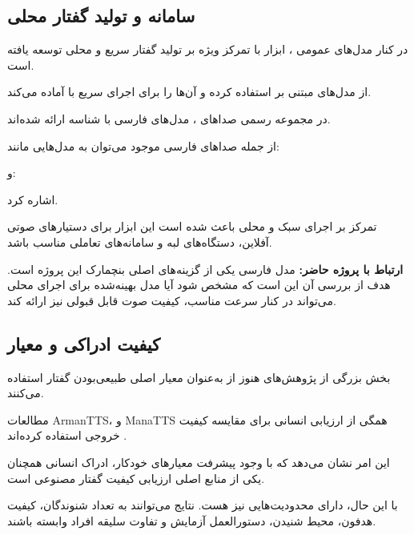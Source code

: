 \subsection{سامانه  و تولید گفتار محلی}

در کنار مدل‌های عمومی ، ابزار
با تمرکز ویژه بر تولید گفتار سریع و محلی توسعه یافته است.

 از مدل‌های مبتنی بر  استفاده کرده و آن‌ها را
برای اجرای سریع با
آماده می‌کند.

در مجموعه رسمی صداهای ، مدل‌های فارسی با شناسه
ارائه شده‌اند.

از جمله صداهای فارسی موجود می‌توان به مدل‌هایی مانند:

\begin{center}
\end{center}

و:

\begin{center}
\end{center}

اشاره کرد.

تمرکز  بر اجرای سبک و محلی باعث شده است این ابزار برای
دستیارهای صوتی آفلاین، دستگاه‌های لبه و سامانه‌های تعاملی
مناسب باشد.

\textbf{ارتباط با پروژه حاضر:}
مدل  فارسی یکی از گزینه‌های اصلی بنچمارک  این پروژه
است.
هدف از بررسی آن این است که مشخص شود آیا مدل بهینه‌شده برای
اجرای محلی می‌تواند در کنار سرعت مناسب، کیفیت صوت قابل
قبولی نیز ارائه کند.


\subsection{کیفیت ادراکی و معیار }

بخش بزرگی از پژوهش‌های  هنوز از
به‌عنوان معیار اصلی طبیعی‌بودن گفتار استفاده می‌کنند.

مطالعات ArmanTTS،  و ManaTTS همگی از
ارزیابی انسانی  برای مقایسه کیفیت خروجی استفاده کرده‌اند
\cite{shamgholi2023armantts,
      adibian2023deepminemultitts,
      qharabagh2025manatts}.

این امر نشان می‌دهد که با وجود پیشرفت معیارهای خودکار،
ادراک انسانی همچنان یکی از منابع اصلی ارزیابی کیفیت
گفتار مصنوعی است.

با این حال،  دارای محدودیت‌هایی نیز هست.
نتایج می‌توانند به تعداد شنوندگان، کیفیت هدفون، محیط شنیدن،
دستورالعمل آزمایش و تفاوت سلیقه افراد وابسته باشند.

